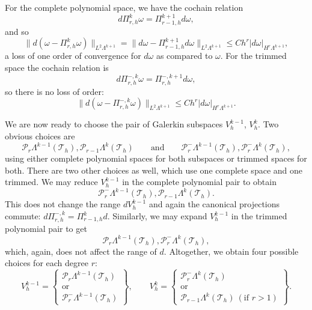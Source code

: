 {For the complete polynomial space, we have the cochain relation}
\[
d\Pi_{r,h}^k\omega=\Pi_{r-1,h}^{k+1}d\omega,
\]
{and so}
\[
\|d(\omega-\Pi_{r,h}^k\omega)\|_{L^2\Lambda^{k+1}}=\|d\omega-\Pi_{r-1,h}^{k+1}d\omega\|_{L^2\Lambda^{k+1}}\leq Ch^r|d\omega|_{H^r\Lambda^{k+1}},
\]
{a loss of one order of convergence for $d\omega$ as compared to $\omega$. For the trimmed space the cochain relation is}
\[
d\Pi_{r,h}^{-,k}\omega=\Pi_{r,h}^{-,k+1}d\omega,
\]
{so there is no loss of order:}
\[
\|d(\omega-\Pi_{r,h}^{-,k}\omega)\|_{L^2\Lambda^{k+1}}\leq Ch^r|d\omega|_{H^r\Lambda^{k+1}}.
\]

{We are now ready to choose the pair of Galerkin subspaces $V_h^{k-1}$, $V_h^k$. Two obvious choices are}
\[
\mathcal P_r\Lambda^{k-1}(\mathcal T_h),\mathcal P_{r-1}\Lambda^k(\mathcal T_h)\qquad\text{and}\qquad\mathcal P_r^-\Lambda^{k-1}(\mathcal T_h),\mathcal P_r^-\Lambda^k(\mathcal T_h),
\]
{using either complete polynomial spaces for both subspaces or trimmed spaces for both. There are two other choices as well, which use one complete space and one trimmed. We may reduce $V_h^{k-1}$ in the complete polynomial pair to obtain}
\[
\mathcal P_r^-\Lambda^{k-1}(\mathcal T_h),\mathcal P_{r-1}\Lambda^k(\mathcal T_h).
\]
{This does not change the range $dV_h^{k-1}$ and again the canonical projections commute: $d\Pi_{r,h}^{-,k}=\Pi_{r-1,h}^kd$. Similarly, we may expand $V_h^{k-1}$ in the trimmed polynomial pair to get}
\[
\mathcal P_r\Lambda^{k-1}(\mathcal T_h),\mathcal P_r^-\Lambda^k(\mathcal T_h),
\]
{which, again, does not affect the range of $d$. Altogether, we obtain four possible choices for each degree $r$:}
\begin{equation}\label{eq:four-galerkin-form-pairs}
V_h^{k-1}=\left\{\begin{gathered}\mathcal P_r\Lambda^{k-1}(\mathcal T_h)\\\text{or}\\\mathcal P_r^-\Lambda^{k-1}(\mathcal T_h)\end{gathered}\right\},\qquad
V_h^k=\left\{\begin{gathered}\mathcal P_r^-\Lambda^k(\mathcal T_h)\\\text{or}\\\mathcal P_{r-1}\Lambda^k(\mathcal T_h)\ (\text{if }r>1)\end{gathered}\right\}.
\end{equation}

